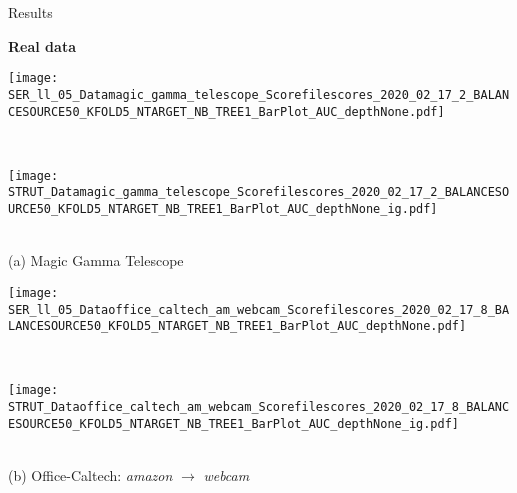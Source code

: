 \begin{frame}{Results}

\centering
\textbf{Real data}

\renewcommand{\ratio}{1.0}
        \centering
        \begin{minipage}[t]{0.33\linewidth}\vspace{0pt}
            \centering
            \begin{minipage}[t]{\ratio\linewidth}\vspace{0pt}
            \centerline{\texttt{[image: SER\_ll\_05\_Datamagic\_gamma\_telescope\_Scorefilescores\_2020\_02\_17\_2\_BALANCESOURCE50\_KFOLD5\_NTARGET\_NB\_TREE1\_BarPlot\_AUC\_depthNone.pdf]}}
            \end{minipage}\\
            \begin{minipage}[t]{\ratio\linewidth}\vspace{0cm}
            \centerline{\texttt{[image: STRUT\_Datamagic\_gamma\_telescope\_Scorefilescores\_2020\_02\_17\_2\_BALANCESOURCE50\_KFOLD5\_NTARGET\_NB\_TREE1\_BarPlot\_AUC\_depthNone\_ig.pdf]}}
            \end{minipage}\\
            \medskip
            {\small(a)\; Magic Gamma Telescope}
        \end{minipage}\hfill
        \begin{minipage}[t]{0.33\linewidth}\vspace{0pt}
            \centering
            \begin{minipage}[t]{\ratio\linewidth}\vspace{0pt}
            \centerline{\texttt{[image: SER\_ll\_05\_Dataoffice\_caltech\_am\_webcam\_Scorefilescores\_2020\_02\_17\_8\_BALANCESOURCE50\_KFOLD5\_NTARGET\_NB\_TREE1\_BarPlot\_AUC\_depthNone.pdf]}}
            \end{minipage}\\
            \begin{minipage}[t]{\ratio\linewidth}\vspace{0cm}
            \centerline{\texttt{[image: STRUT\_Dataoffice\_caltech\_am\_webcam\_Scorefilescores\_2020\_02\_17\_8\_BALANCESOURCE50\_KFOLD5\_NTARGET\_NB\_TREE1\_BarPlot\_AUC\_depthNone\_ig.pdf]}}
            \end{minipage}\\
            \medskip
            {\small(b)\; Office-Caltech: \emph{amazon} $\rightarrow$ \emph{webcam}}

\end{minipage}
\end{frame}
